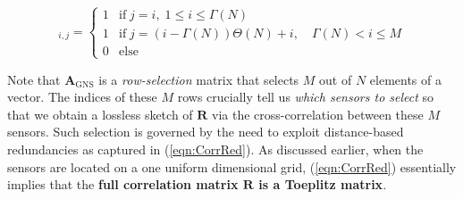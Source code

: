 {\begin{definition}
\begin{equation}
 [\mathbf{A}_{\text{GNS}}]_{i,j}= \begin{cases}  1 & \textrm{if} \; j = i,\; 1 \le i \le \Gamma(N) \\
1 & \textrm{if} \; j=(i-\Gamma(N))\Theta(N)+i, \quad \Gamma(N) < i \le M  \\
0 &  \text{else}
\end{cases}
\label{def_A}
\end{equation}
\end{definition}
Note that $\mathbf{A}_{\text{GNS}}$ is  a {\em row-selection} matrix that selects $M$ out of $N$ elements of a vector. The indices of these $M$ rows crucially tell us {\em which sensors to select} so that we  obtain a lossless sketch of $\mathbf{R}$ via  the cross-correlation between these $M$ sensors. Such selection is governed by the need to exploit distance-based redundancies as captured in (\ref{eqn:CorrRed}). As discussed earlier, when the sensors are located on a one uniform dimensional grid, (\ref{eqn:CorrRed}) essentially implies that the {\bf full correlation matrix $\mathbf{R}$ is a Toeplitz matrix}. %
}

